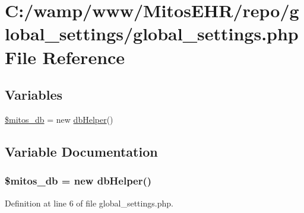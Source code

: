 \hypertarget{global__settings_8php}{\section{\-C\-:/wamp/www/\-Mitos\-E\-H\-R/repo/global\-\_\-settings/global\-\_\-settings.php \-File \-Reference}
\label{global__settings_8php}
}
\subsection*{\-Variables}
\begin{DoxyCompactItemize}
\item 
\hyperlink{global__settings_8php_ab5d961f93efe4e2e8d8374f01dd6c65a}{\$mitos\-\_\-db} = new \hyperlink{classdb_helper}{db\-Helper}()
\end{DoxyCompactItemize}


\subsection{\-Variable \-Documentation}
\hypertarget{global__settings_8php_ab5d961f93efe4e2e8d8374f01dd6c65a}{
\subsubsection[{\$mitos\-\_\-db}]{\setlength{\rightskip}{0pt plus 5cm}\$mitos\-\_\-db = new {\bf db\-Helper}()}}\label{global__settings_8php_ab5d961f93efe4e2e8d8374f01dd6c65a}


\-Definition at line 6 of file global\-\_\-settings.\-php.


